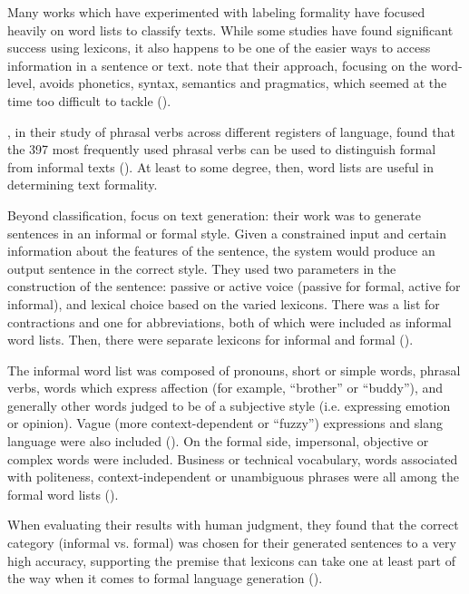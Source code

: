 Many works which have experimented with labeling formality have focused heavily on word lists to classify texts. While some studies have found significant success using lexicons, it also happens to be one of the easier ways to access information in a sentence or text. \cite{heylighen1999formality} note that their approach, focusing on the word-level, avoids phonetics, syntax, semantics and pragmatics, which seemed at the time too difficult to tackle (\cite{heylighen1999formality}).

\cite{dempsey2007using}, in their study of phrasal verbs across different registers of language, found that the 397 most frequently used phrasal verbs can be used to distinguish formal from informal texts (\cite{dempsey2007using}). At least to some degree, then, word lists are useful in determining text formality.

Beyond classification, \cite{sheikha2011generation} focus on text generation: their work was to generate sentences in an informal or formal style. Given a constrained input and certain information about the features of the sentence, the system would produce an output sentence in the correct style. They used two parameters in the construction of the sentence: passive or active voice (passive for formal, active for informal), and lexical choice based on the varied lexicons. There was a list for contractions and one for abbreviations, both of which were included as informal word lists. Then, there were separate lexicons for informal and formal (\cite{sheikha2011generation}).

The informal word list was composed of pronouns, short or simple words, phrasal verbs, words which express affection (for example, ``brother'' or ``buddy''), and generally other words judged to be of a subjective style (i.e. expressing emotion or opinion). Vague (more context-dependent or ``fuzzy'') expressions and slang language were also included (\cite{sheikha2011generation}). On the formal side, impersonal, objective or complex words were included. Business or technical vocabulary, words associated with politeness, context-independent or unambiguous phrases were all among the formal word lists (\cite{sheikha2011generation}).

When evaluating their results with human judgment, they found that the correct category (informal vs. formal) was chosen for their generated sentences to a very high accuracy, supporting the premise that lexicons can take one at least part of the way when it comes to formal language generation (\cite{sheikha2011generation}).

